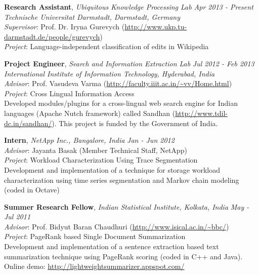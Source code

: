 \documentclass[9pt]{article}
\newenvironment{changemargin}[2]{%
  \begin{list}{}{%
    \setlength{\topsep}{0pt}%
    \setlength{\leftmargin}{#1}%
    \setlength{\rightmargin}{#2}%
    \setlength{\listparindent}{\parindent}%
    \setlength{\itemindent}{\parindent}%
    \setlength{\parsep}{\parskip}%
  }%
  \item[]}{\end{list}
}
\newenvironment{body} {
	\vspace*{-16pt}
	\begin{changemargin}{-0.25in}{-0.5in}
  }	
	{\end{changemargin}
}
\begin{document}
\begin{body}
	\vspace{14pt}
	\textbf{Research Assistant}, \emph{Ubiquitous Knowledge Processing Lab} \hfill \emph{Apr 2013 - Present} \\
	\emph{Technische Universitat Darmstadt, Darmstadt, Germany} \\
	\emph{Supervisor}: Prof. Dr. Iryna Gurevych (\url{http://www.ukp.tu-darmstadt.de/people/gurevych}) \\
	\emph{Project}: Language-independent classification of edits in Wikipedia \\
	
	\medskip
	
	\textbf {Project Engineer}, \emph{Search and Information Extraction Lab} \hfill \emph{Jul 2012 - Feb 2013} \\
	\emph{International Institute of Information Technology, Hyderabad, India} \\
	\emph{Advisor}: Prof. Vasudeva Varma (\url{http://faculty.iiit.ac.in/~vv/Home.html}) \\
	\emph{Project}: Cross Lingual Information Access \\
	Developed modules/plugins for a cross-lingual web search engine for Indian languages (Apache Nutch framework) called Sandhan (\url{http://www.tdil-dc.in/sandhan/}). 
	This project is funded by the Government of India.
	
	\medskip
	
	\textbf {Intern}, \emph{NetApp Inc., Bangalore, India} \hfill \emph{Jan - Jun 2012} \\
	\emph{Advisor}: Jayanta Basak (Member Technical Staff, NetApp) \\
	\emph{Project}: Workload Characterization Using Trace Segmentation \\
	Development and implementation of a technique for storage workload characterization using time series segmentation and Markov chain modeling (coded in Octave) \\
	
	\medskip
	
	\textbf {Summer Research Fellow}, \emph{Indian Statistical Institute, Kolkata, India} \hfill \emph{May - Jul 2011} \\
	\emph{Advisor}: Prof. Bidyut Baran Chaudhuri (\url{http://www.isical.ac.in/~bbc/}) \\
	\emph{Project}: PageRank based Single Document Summarization \\
	Development and implementation of a sentence extraction based text summarization technique using PageRank scoring (coded in C++ and Java). Online demo: \url{http://lightweightsummarizer.appspot.com/}

\end{body}
\end{document}
